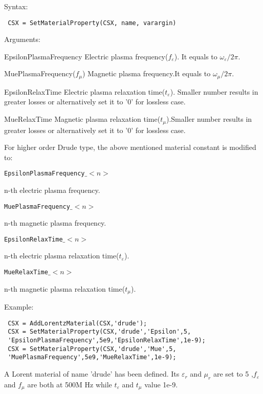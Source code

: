  \begin{FontDescr}{Syntax:}
  \begin{lstlisting}
 CSX = SetMaterialProperty(CSX, name, varargin)
  \end{lstlisting}
 \end{FontDescr}
 
 \begin{FontDescr}{Arguments:}  
 
  \begin{FontPara}{EpsilonPlasmaFrequency}
  Electric plasma frequency($f_{\varepsilon}$). It equals to   $\omega_{\varepsilon}/2\pi$. 
  \end{FontPara} 
  \begin{FontPara}{MuePlasmaFrequency}($f_{\mu}$)
  Magnetic plasma frequency.It equals to $\omega_{\mu}/2\pi$.   
  \end{FontPara}
  \begin{FontPara}{EpsilonRelaxTime}   
   Electric plasma relaxation time($t_{\varepsilon}$). Smaller number results in greater losses or alternatively set it to '0' for lossless case. 
   \end{FontPara}
  \begin{FontPara}{MueRelaxTime}  
  Magnetic plasma relaxation time($t_{\mu}$).Smaller number results in greater losses or alternatively set it to '0' for lossless case.
 \end{FontPara}

For higher order Drude type, the above mentioned material constant is modified to: 

 \textcolor{varcol}{\texttt{EpsilonPlasmaFrequency$\_<n>$}}
\begin{myindentpar}
 n-th electric plasma frequency.
\end{myindentpar} 
  \textcolor{varcol}{\texttt{MuePlasmaFrequency$\_<n>$} }  
  \begin{myindentpar}
  n-th magnetic plasma frequency. 
  \end{myindentpar} 
  \textcolor{varcol}{\texttt{EpsilonRelaxTime$\_<n>$}} 
   \begin{myindentpar}
   n-th electric plasma relaxation time($t_{\varepsilon}$).   \end{myindentpar} 
 \textcolor{varcol}{\texttt{MueRelaxTime$\_<n>$}} 
\begin{myindentpar}
n-th magnetic plasma relaxation time($t_{\mu}$).
 \end{myindentpar}  
\end{FontDescr}  


\begin{FontDescr}{Example:}  
\begin{lstlisting} 
 CSX = AddLorentzMaterial(CSX,'drude');
 CSX = SetMaterialProperty(CSX,'drude','Epsilon',5,
 'EpsilonPlasmaFrequency',5e9,'EpsilonRelaxTime',1e-9);
 CSX = SetMaterialProperty(CSX,'drude','Mue',5,
 'MuePlasmaFrequency',5e9,'MueRelaxTime',1e-9);
\end{lstlisting}
  
  A Lorent material of name 'drude' has been defined. Its $\varepsilon_{r}$ and $\mu_{r}$ are set to 5 ,$f_{\varepsilon}$ and $f_{\mu}$ are both at 500M Hz while $t_{\varepsilon}$ and $t_{\mu}$ value 1e-9. 
 \end{FontDescr}
  
  
  